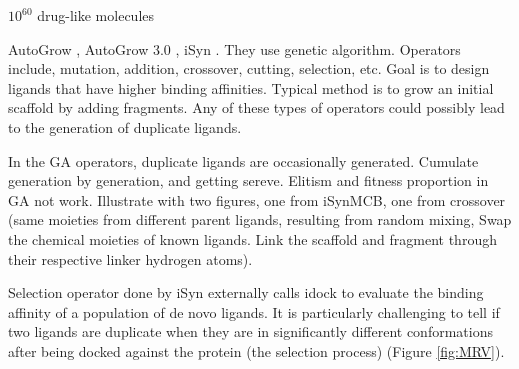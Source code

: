 \documentclass[twocolumn]{svjour3}          %
\begin{document}
$10^{60}$ drug-like molecules \cite{1104} %

AutoGrow \cite{466}, AutoGrow 3.0 \cite{1354}, iSyn \cite{1381,1387}. They use genetic algorithm. Operators include, mutation, addition, crossover, cutting, selection, etc. Goal is to design ligands that have higher binding affinities. Typical method is to grow an initial scaffold by adding fragments. Any of these types of operators could possibly lead to the generation of duplicate ligands.

In the GA operators, duplicate ligands are occasionally generated. Cumulate generation by generation, and getting sereve. Elitism and fitness proportion in GA not work. Illustrate with two figures, one from iSynMCB, one from crossover (same moieties from different parent ligands, resulting from random mixing, Swap the chemical moieties of known ligands. Link the scaffold and fragment through their respective linker hydrogen atoms).

Selection operator done by iSyn externally calls idock \cite{1153} to evaluate the binding affinity of a population of de novo ligands. It is particularly challenging to tell if two ligands are duplicate when they are in significantly different conformations after being docked against the protein (the selection process) (Figure \ref{fig:MRV}).
\end{document}
